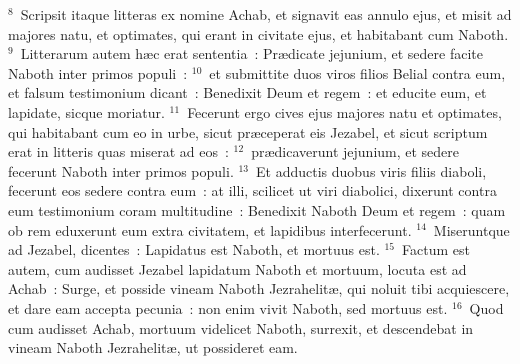${}^{8}$~Scripsit itaque litteras ex nomine Achab, et signavit eas annulo ejus, et misit ad majores natu, et optimates, qui erant in civitate ejus, et habitabant cum Naboth.
${}^{9}$~Litterarum autem h\ae c erat sententia~: Pr\ae dicate jejunium, et sedere facite Naboth inter primos populi~:
${}^{10}$~et submittite duos viros filios Belial contra eum, et falsum testimonium dicant~: Benedixit Deum et regem~: et educite eum, et lapidate, sicque moriatur.
${}^{11}$~Fecerunt ergo cives ejus majores natu et optimates, qui habitabant cum eo in urbe, sicut pr\ae ceperat eis Jezabel, et sicut scriptum erat in litteris quas miserat ad eos~:
${}^{12}$~pr\ae dicaverunt jejunium, et sedere fecerunt Naboth inter primos populi.
${}^{13}$~Et adductis duobus viris filiis diaboli, fecerunt eos sedere contra eum~: at illi, scilicet ut viri diabolici, dixerunt contra eum testimonium coram multitudine~: Benedixit Naboth Deum et regem~: quam ob rem eduxerunt eum extra civitatem, et lapidibus interfecerunt.
${}^{14}$~Miseruntque ad Jezabel, dicentes~: Lapidatus est Naboth, et mortuus est.
${}^{15}$~Factum est autem, cum audisset Jezabel lapidatum Naboth et mortuum, locuta est ad Achab~: Surge, et posside vineam Naboth Jezrahelit\ae , qui noluit tibi acquiescere, et dare eam accepta pecunia~: non enim vivit Naboth, sed mortuus est.
${}^{16}$~Quod cum audisset Achab, mortuum videlicet Naboth, surrexit, et descendebat in vineam Naboth Jezrahelit\ae , ut possideret eam.


